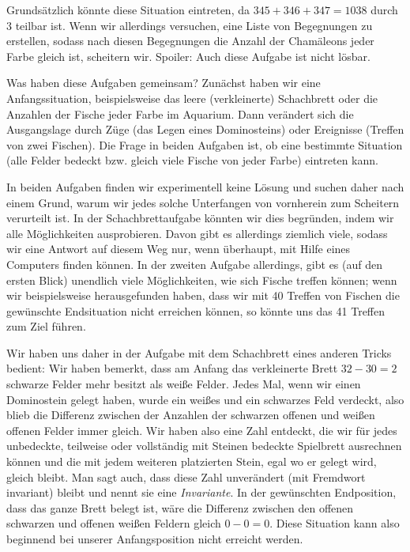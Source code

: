 \documentclass[a4paper,ngerman,12pt]{scrartcl}
\theoremstyle{definition}
\begin{document}
Grundsätzlich könnte diese Situation eintreten, da $345 + 346 + 347 = 1038$ durch $3$ teilbar ist. Wenn wir allerdings versuchen, eine Liste von Begegnungen zu erstellen, sodass nach diesen Begegnungen die Anzahl der Chamäleons jeder Farbe gleich ist, scheitern wir. Spoiler: Auch diese Aufgabe ist nicht lösbar.

Was haben diese Aufgaben gemeinsam? Zunächst haben wir eine Anfangssituation, beispielsweise das leere (verkleinerte) Schachbrett oder die Anzahlen der Fische jeder Farbe im Aquarium. Dann verändert sich die Ausgangslage durch Züge (das Legen eines Dominosteins) oder Ereignisse (Treffen von zwei Fischen). Die Frage in beiden Aufgaben ist, ob eine bestimmte Situation (alle Felder bedeckt bzw. gleich viele Fische von jeder Farbe) eintreten kann.

In beiden Aufgaben finden wir experimentell keine Lösung und suchen daher nach einem Grund, warum wir jedes solche Unterfangen von vornherein zum Scheitern verurteilt ist. In der Schachbrettaufgabe könnten wir dies begründen, indem wir alle Möglichkeiten ausprobieren. Davon gibt es allerdings ziemlich viele, sodass wir eine Antwort auf diesem Weg nur, wenn überhaupt, mit Hilfe eines Computers finden können. In der zweiten Aufgabe allerdings, gibt es (auf den ersten Blick) unendlich viele Möglichkeiten, wie sich Fische treffen können; wenn wir beispielsweise herausgefunden haben, dass wir mit 40 Treffen von Fischen die gewünschte Endsituation nicht erreichen können, so könnte uns das 41 Treffen zum Ziel führen.

Wir haben uns daher in der Aufgabe mit dem Schachbrett eines anderen Tricks bedient: Wir haben bemerkt, dass am Anfang das verkleinerte Brett $32 - 30 = 2$ schwarze Felder mehr besitzt als weiße Felder. Jedes Mal, wenn wir einen Dominostein gelegt haben, wurde ein weißes und ein schwarzes Feld verdeckt, also blieb die Differenz zwischen der Anzahlen der schwarzen offenen und weißen offenen Felder immer gleich. Wir haben also eine Zahl entdeckt, die wir für jedes unbedeckte, teilweise oder vollständig mit Steinen bedeckte Spielbrett ausrechnen können und die mit jedem weiteren platzierten Stein, egal wo er gelegt wird, gleich bleibt. Man sagt auch, dass diese Zahl unverändert (mit Fremdwort invariant) bleibt und nennt sie eine \emph{Invariante}. In der gewünschten Endposition, dass das ganze Brett belegt ist, wäre die Differenz zwischen den offenen schwarzen und offenen weißen Feldern gleich $0 - 0 = 0$. Diese Situation kann also beginnend bei unserer Anfangsposition nicht erreicht werden.
\end{document}
